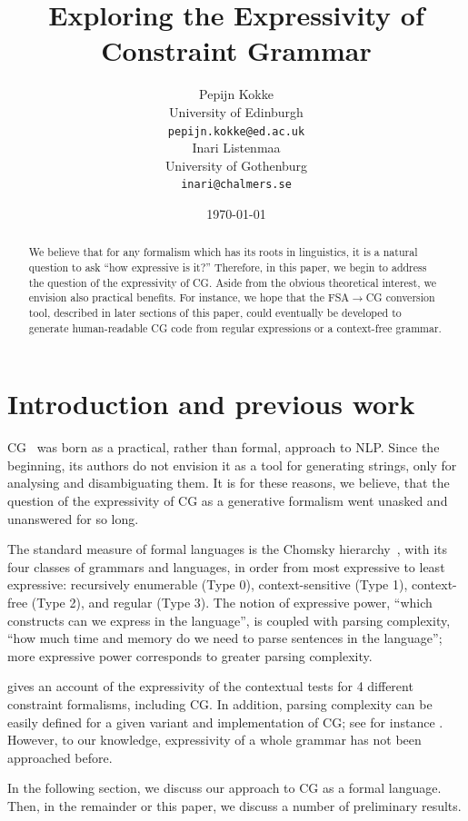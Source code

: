 \documentclass[11pt]{article}
\title{Exploring the Expressivity of Constraint Grammar}
\author{%
  Pepijn Kokke \\
  University of Edinburgh \\
  {\tt pepijn.kokke@ed.ac.uk} \\\And
  Inari Listenmaa \\
  University of Gothenburg \\
  {\tt inari@chalmers.se} }
\date{\today}
\begin{document}
\maketitle

\begin{abstract}
  We believe that for any formalism which has its roots in linguistics, it is a
  natural question to ask ``how expressive is it?'' Therefore, in this paper, we
  begin to address the question of the expressivity of CG.
  Aside from the obvious theoretical interest, we envision also practical
  benefits. For instance, we hope that the FSA$\rightarrow$CG conversion tool, described in
  later sections of this paper, could eventually be developed to generate
  human-readable CG code from regular expressions or a context-free grammar. 
\end{abstract}


\section{Introduction and previous work}
CG~\cite{karlsson1995constraint} was born as a practical, rather than formal, 
approach to NLP. 
Since the beginning, its authors do not envision it as a tool for 
generating strings, only for analysing and disambiguating them.
It is for these reasons, we believe, that the question of the expressivity of CG
as a generative formalism went unasked and unanswered for so long.

The standard measure of formal languages is the Chomsky
hierarchy~\cite{chomsky1956hierarchy}, with its four classes of grammars and
languages, in order from most expressive to least expressive: recursively
enumerable (Type 0), context-sensitive (Type 1), context-free (Type 2), and
regular (Type 3). The notion of expressive power, ``which constructs can we
express in the language'', is coupled with parsing complexity, ``how much time
and memory do we need to parse sentences in the language''; more expressive
power corresponds to greater parsing complexity.

 gives an account of the expressivity of
the contextual tests for 4 different constraint formalisms, including CG. 
In addition, parsing complexity can be easily defined for a given variant and 
implementation of CG; see for instance .
However, to our knowledge, expressivity of a whole grammar has not been approached before.

In the following section, we discuss our approach to CG as a formal language.
Then, in the remainder or this paper, we discuss a number of preliminary
results.
\end{document}
